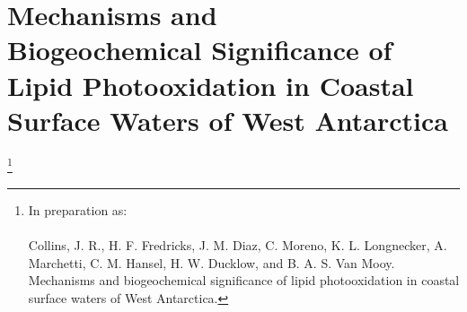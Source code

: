 
\begingroup%
\makeatletter%
\cleardoublepage%
\let\newpage\relax%
\let\clearpage\relax%
\vspace*{\fill}%
\vspace*{\dimexpr-50\p@-\baselineskip}%
\chapter[Mechanisms and Biogeochemical Significance of Lipid Photooxidation in Coastal Surface Waters of West Antarctica]{Mechanisms and \\Biogeochemical Significance of Lipid Photooxidation in Coastal Surface Waters of West Antarctica}
\label{chap4}
\let\thefootnote\relax\footnote{{\setlength{\parindent}{0pt}In preparation as:\\\\Collins, J. R., H. F. Fredricks, J. M. Diaz, C. Moreno, K. L. Longnecker, A. Marchetti, C. M. Hansel, H. W. Ducklow, and B. A. S. Van Mooy. Mechanisms and biogeochemical significance of lipid photooxidation in coastal surface waters of West Antarctica.}}
\vspace*{\fill}%
\endgroup%

\clearpage
